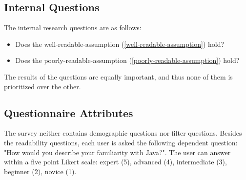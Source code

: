 \documentclass[%
class=scrreprt,
chapterprefix=false,%
open=right,%
twoside=false,%
paper=a4,%
logofile={Logo\_zentral\_farbig\_EN.png},%
thesistype=masterproposal,%
UKenglish,%
]{se2thesis}
\begin{document}
\subsection{Internal Questions} %
The internal research questions are as follows:
\begin{itemize}
	\item Does the well-readable-assumption (\ref{well-readable-assumption}) hold?
	\item Does the poorly-readable-assumption (\ref{poorly-readable-assumption}) hold?
\end{itemize}
The results of the questions are equally important, and thus none of them is prioritized over the other.

\subsection{Questionnaire Attributes} \label{questionnaire-attributes}
The survey neither contains demographic questions nor filter questions. Besides the readability questions, each user is asked the following dependent question: "How would you describe your familiarity with Java?". The user can answer within a five point Likert scale: expert (5), advanced (4), intermediate (3), beginner (2), novice (1).

	
	
	
	
\end{document}
